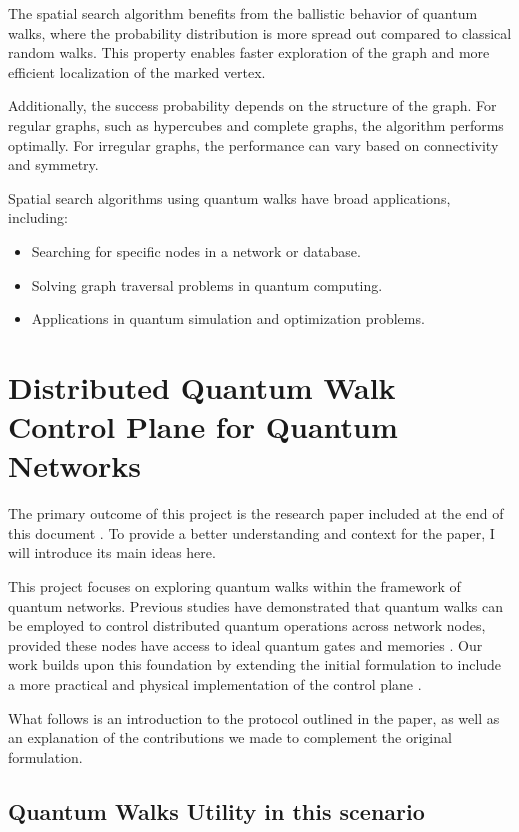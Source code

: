 \documentclass{article}
\begin{document}
			The spatial search algorithm benefits from the ballistic behavior of quantum walks, where the probability distribution is more spread out compared to classical random walks. This property enables faster exploration of the graph and more efficient localization of the marked vertex.

			Additionally, the success probability depends on the structure of the graph. For regular graphs, such as hypercubes and complete graphs, the algorithm performs optimally. For irregular graphs, the performance can vary based on connectivity and symmetry.

			Spatial search algorithms using quantum walks have broad applications, including:
			\begin{itemize}
				\item Searching for specific nodes in a network or database.
				\item Solving graph traversal problems in quantum computing.
				\item Applications in quantum simulation and optimization problems.
			\end{itemize}



\newpage

\section{Distributed Quantum Walk Control Plane for Quantum Networks}

	The primary outcome of this project is the research paper included at the end of this document \cite{meu}. To provide a better understanding and context for the paper, I will introduce its main ideas here.

	This project focuses on exploring quantum walks within the framework of quantum networks. Previous studies have demonstrated that quantum walks can be employed to control distributed quantum operations across network nodes, provided these nodes have access to ideal quantum gates and memories \cite{controlplane}. Our work builds upon this foundation by extending the initial formulation to include a more practical and physical implementation of the control plane \cite{universalcontrolplane}.

	What follows is an introduction to the protocol outlined in the paper, as well as an explanation of the contributions we made to complement the original formulation.
    
    \subsection{Quantum Walks Utility in this scenario}
    
\end{document}
